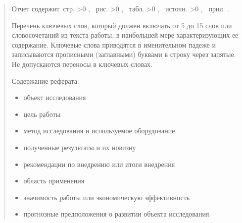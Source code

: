 \begin{abstract}

    Отчет содержит \pageref{LastPage}\,стр.%
    \ifnum \totfig >0
    , \totfig~рис.%
    \fi
    \ifnum \tottab >0
    , \tottab~табл.%
    \fi
    \ifnum \totbib >0
    , \totbib~источн.%
    \fi
    \ifnum \totapp >0
    , \totapp~прил.%
    \else
    .%
    \fi

    \vspace{1cm}

    Перечень ключевых слов, который должен включать от 5 до 15 слов или словосочетаний из текста работы, в наибольшей мере характеризующих ее содержание.
    Ключевые слова приводятся в именительном падеже и записываются прописными (заглавными) буквами в строку через запятые.
    Не допускаются переносы в ключевых словах.

    Содержание реферата:

    \begin{itemize}
        \item объект исследования
        \item цель работы
        \item метод исследования и используемое оборудование
        \item полученные результаты и их новизну
        \item рекомендации по внедрению или итоги внедрения
        \item область применения
        \item значимость работы или экономическую эффективность
        \item прогнозные предположения о развитии объекта исследования
    \end{itemize}

\end{abstract}